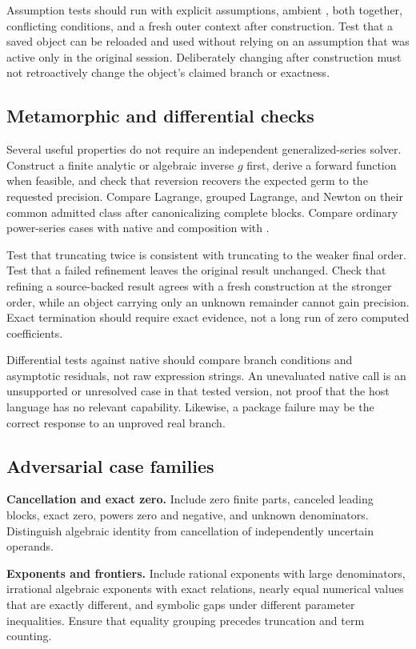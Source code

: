 Assumption tests should run with explicit assumptions, ambient , both together, conflicting conditions, and a fresh outer context after construction. Test that a saved object can be reloaded and used without relying on an assumption that was active only in the original session. Deliberately changing  after construction must not retroactively change the object's claimed branch or exactness.

\subsection{Metamorphic and differential checks}
Several useful properties do not require an independent generalized-series solver. Construct a finite analytic or algebraic inverse $g$ first, derive a forward function when feasible, and check that reversion recovers the expected germ to the requested precision. Compare Lagrange, grouped Lagrange, and Newton on their common admitted class after canonicalizing complete blocks. Compare ordinary power-series cases with native  and composition with .\cite{wl-inverse,wl-compose}

Test that truncating twice is consistent with truncating to the weaker final order. Test that a failed refinement leaves the original result unchanged. Check that refining a source-backed result agrees with a fresh construction at the stronger order, while an object carrying only an unknown remainder cannot gain precision. Exact termination should require exact evidence, not a long run of zero computed coefficients.

Differential tests against native  should compare branch conditions and asymptotic residuals, not raw expression strings. An unevaluated native call is an unsupported or unresolved case in that tested version, not proof that the host language has no relevant capability. Likewise, a package failure may be the correct response to an unproved real branch.

\subsection{Adversarial case families}
\textbf{Cancellation and exact zero.} Include zero finite parts, canceled leading blocks, exact zero, powers zero and negative, and unknown denominators. Distinguish algebraic identity from cancellation of independently uncertain operands.

\textbf{Exponents and frontiers.} Include rational exponents with large denominators, irrational algebraic exponents with exact relations, nearly equal numerical values that are exactly different, and symbolic gaps under different parameter inequalities. Ensure that equality grouping precedes truncation and term counting.

